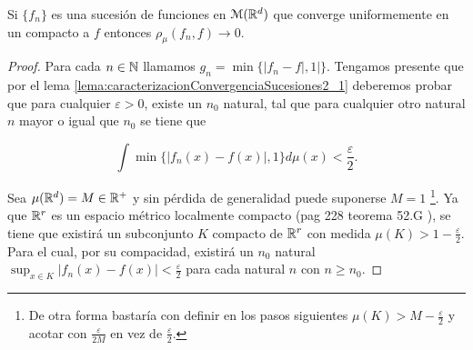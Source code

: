 \begin{lema} \label{lema:2_2_convergencia_uniforme_en_compactos}  
    Si $\{f_n\}$ es una sucesión de funciones en $\mathcal{M}(\mathbb{R}^d)$ que converge
    uniformemente en un compacto a $f$ entonces $\rho_{\mu}(f_n, f) \longrightarrow 0$. 
\end{lema}  
\begin{proof} Para cada $n\in \mathbb{N}$ llamamos $g_n = \min\{|f_n - f|, 1|\}$.
    Tengamos presente que por el  lema \ref{lema:caracterizacionConvergenciaSucesiones2_1} 
    deberemos probar que para cualquier $\varepsilon > 0$, 
    existe un $n_0$ natural, tal que para cualquier otro natural $n$ mayor o igual que $n_0$ se tiene que 

    \begin{equation}
        \int \min \{ |f_n(x) - f(x)|, 1\} d\mu(x) 
        < 
        \frac{\varepsilon}{2}.
    \end{equation}  

    Sea $\mu(\mathbb{R}^d) = M \in \mathbb{R}^+$  y 
    sin pérdida de generalidad puede suponerse $M = 1$
     \footnote{De otra forma bastaría con definir 
    en los pasos siguientes $\mu(K) > M - \frac{\varepsilon}{2}$ y acotar con $\frac{\varepsilon}{2M}$ 
    en vez de $\frac{\varepsilon}{2}$.}. 
    Ya que $\mathbb{R}^r$ es un espacio métrico localmente compacto
    (pag 228 teorema 52.G \cite{nla.cat-vn1819421}),
    se tiene que existirá un subconjunto $K$ compacto de $\mathbb{R}^r$ con medida $\mu(K) > 1 - \frac{\varepsilon}{2}.$
    Para el cual, por su compacidad, existirá un  $n_0$ natural 
    $\sup_{x \in K} |f_n(x) - f(x)| < \frac{\varepsilon}{2}$   
    para cada natural $n$ con $n\geq n_0.$ 
    

\end{proof}
